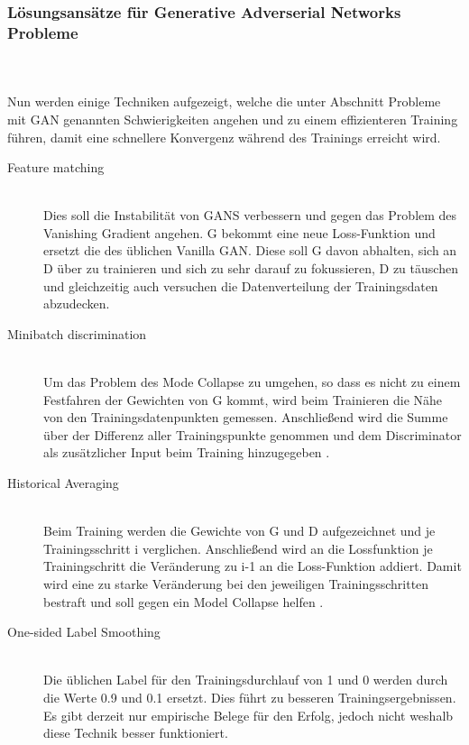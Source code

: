 \documentclass{llncs}
\begin{document}
\subsubsection{Lösungsansätze für Generative Adverserial Networks Probleme}
~\\\\
Nun werden einige Techniken aufgezeigt, welche die unter Abschnitt Probleme mit GAN genannten Schwierigkeiten angehen und zu einem effizienteren Training führen, damit eine schnellere Konvergenz während des Trainings erreicht wird.
\\
\begin{description}
	\item[Feature matching]
	~\\
	Dies soll die Instabilität von GANS verbessern und gegen das Problem des Vanishing Gradient angehen. G bekommt eine neue Loss-Funktion und ersetzt die des üblichen Vanilla GAN. Diese soll G davon abhalten, sich an D über zu trainieren und sich zu sehr darauf zu fokussieren, D zu täuschen und gleichzeitig auch versuchen die Datenverteilung der Trainingsdaten abzudecken\cite{improvingan}.\\
	
	\item[Minibatch discrimination] 
	~\\
	Um das Problem des Mode Collapse zu umgehen, so dass es nicht zu einem Festfahren der Gewichten von G kommt, wird beim Trainieren die Nähe von den Trainingsdatenpunkten gemessen. Anschließend wird die Summe über der Differenz aller Trainingspunkte genommen und dem Discriminator als zusätzlicher Input beim Training hinzugegeben \cite{improvingan}.\\
	
	\item[Historical Averaging]
	~\\
	Beim Training werden die Gewichte von G und D aufgezeichnet und je Trainingsschritt i verglichen. Anschließend wird an die Lossfunktion je Trainingschritt die Veränderung zu i-1 an die Loss-Funktion addiert. Damit wird eine zu starke Veränderung bei den jeweiligen Trainingsschritten bestraft und soll gegen ein Model Collapse helfen \cite{improvingan}.\\
	
	\item[One-sided Label Smoothing]
	~\\
	Die üblichen Label für den Trainingsdurchlauf von 1 und 0 werden durch die Werte 0.9 und 0.1 ersetzt. Dies führt zu besseren Trainingsergebnissen. Es gibt derzeit nur empirische Belege für den Erfolg, jedoch nicht weshalb diese Technik besser funktioniert\cite{improvingan}.\\
	

\end{description}
\end{document}
